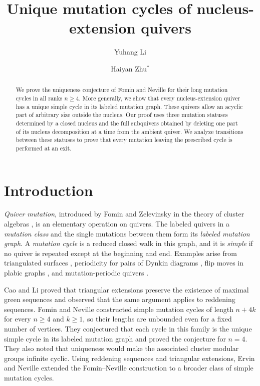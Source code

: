 \documentclass[10pt,a4paper]{amsart}
\title[Unique mutation cycles]{Unique mutation cycles of nucleus-extension quivers}
\author{Yuhang Li}
\author{Haiyan Zhu$^{*}$}
\theoremstyle{definition}
\theoremstyle{definition}
\numberwithin{equation}{section}
\numberwithin{table}{section}
\begin{document}
\begin{abstract}
We prove the uniqueness conjecture of Fomin and Neville for their long
mutation cycles in all ranks $n\ge4$. More generally, we show that every
nucleus-extension quiver has a unique simple cycle in its labeled mutation
graph. These quivers allow an acyclic part of arbitrary size outside the
nucleus. Our proof uses three mutation statuses determined by a closed
nucleus and the full subquivers obtained by deleting one part of its nucleus
decomposition at a time from the ambient quiver. We analyze transitions
between these statuses to prove that every mutation leaving the prescribed
cycle is performed at an exit.
\end{abstract}

\maketitle
\enlargethispage{2pt}

\section{Introduction}\label{sec:introduction}

\emph{Quiver mutation}, introduced by Fomin and Zelevinsky in the theory of
cluster algebras \cite{FZ02}, is an elementary operation on quivers. The
labeled quivers in a \emph{mutation class} and the single mutations between
them form its \emph{labeled mutation graph}. A \emph{mutation cycle} is a
reduced closed walk in this graph, and it is \emph{simple} if no quiver
is repeated except at the beginning and end. Examples arise from
triangulated surfaces \cite{FST08}, periodicity for pairs of Dynkin diagrams
\cite{Kel13}, flip moves in plabic graphs \cite{BW20}, and mutation-periodic
quivers \cite{FM11}.

Cao and Li \cite{CL19} proved that triangular extensions preserve the
existence of maximal green sequences and observed that the same argument
applies to reddening sequences. Fomin and Neville \cite{FN25} constructed
simple mutation cycles of length $n+4k$ for every $n\ge4$ and $k\ge1$, so
their lengths are unbounded even for a fixed number of vertices. They
conjectured that each cycle in this family is the unique simple cycle in its
labeled mutation graph and proved the conjecture for $n=4$. They also noted
that uniqueness would make the associated cluster modular groups
\cite{FG09} infinite cyclic. Using reddening sequences and triangular
extensions, Ervin and Neville \cite[Theorem~4.24]{EN26} extended the
Fomin--Neville construction to a broader class of simple mutation cycles.
\end{document}
